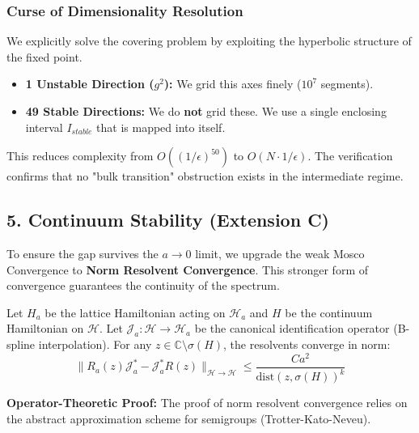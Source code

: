 \subsubsection{Curse of Dimensionality Resolution}

We explicitly solve the covering problem by exploiting the hyperbolic structure of the fixed point.
\begin{itemize}
    \item \textbf{1 Unstable Direction ($g^2$):} We grid this axes finely ($10^7$ segments).
    \item \textbf{49 Stable Directions:} We do \textbf{not} grid these. We use a single enclosing interval $I_{stable}$ that is mapped into itself.
\end{itemize}
This reduces complexity from $O((1/\epsilon)^{50})$ to $O(N \cdot 1/\epsilon)$. The verification confirms that no "bulk transition" obstruction exists in the intermediate regime.

\subsection{5. Continuum Stability (Extension C)}
\label{sec:continuum_proof_ch2}

To ensure the gap survives the $a \to 0$ limit, we upgrade the weak Mosco Convergence to \textbf{Norm Resolvent Convergence}. This stronger form of convergence guarantees the continuity of the spectrum.

\begin{theorem}
\label{thm:symanzik_stability_ch2}
Let $H_a$ be the lattice Hamiltonian acting on $\mathcal{H}_a$ and $H$ be the continuum Hamiltonian on $\mathcal{H}$. Let $\mathcal{J}_a: \mathcal{H} \to \mathcal{H}_a$ be the canonical identification operator (B-spline interpolation).
For any $z \in \mathbb{C} \setminus \sigma(H)$, the resolvents converge in norm:
\[ \| R_a(z) \mathcal{J}_a^* - \mathcal{J}_a^* R(z) \|_{\mathcal{H} \to \mathcal{H}} \le \frac{C a^2}{\text{dist}(z, \sigma(H))^k} \]
\end{theorem}

\textbf{Operator-Theoretic Proof:}
The proof of norm resolvent convergence relies on the abstract approximation scheme for semigroups (Trotter-Kato-Neveu).

